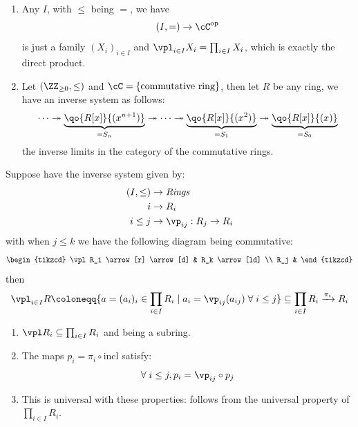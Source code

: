 \begin{eg}
	\leavevmode
	\begin{enumerate}
		\item Any \( I \), with \( \leq \) being \( = \), we have
		      \[
			      (I,=) \to \cC^\text{op}
		      \]
		      is just a family \( (X_i)_{i\in I} \) and \( \vpl_{i\in I}X_i = \prod_{i\in I} X_i \), which
		      is exactly the direct product.
		\item Let \( (\ZZ_{\geq 0}, \leq) \) and \( \cC = \{\text{commutative ring}\} \), then let \( R \) be any
		      ring, we have an inverse system as follows:
		      \[
			      \cdots \twoheadrightarrow \underbrace{\qo{R[x]}{(x^{n+1})}}_{=S_n} \twoheadrightarrow \cdots
			      \twoheadrightarrow \underbrace{\qo{R[x]}{(x^2)}}_{=S_1} \twoheadrightarrow \underbrace{\qo{R[x]}{(x)}}_{=S_0}
		      \]
		      the inverse limits in the category of the commutative rings.
	\end{enumerate}
\end{eg}

\begin{remark}
	Suppose have the inverse system given by:
	\[
		\begin{aligned}
			(I,\leq) & \to \text{\textit{Rings}} \\
			i        & \to R_i                   \\
			i\leq j  & \to \vp_{ij}: R_j \to R_i
		\end{aligned}
	\]
	with when \( j\leq k \) we have the following diagram being commutative:
	\[
		\begin{tikzcd}
			\vpl R_i \arrow[r] \arrow[d] & R_k \arrow[ld] \\
			R_j &
		\end{tikzcd}
	\]
	then
	\[
		\vpl_{i\in I} R \coloneqq  \{a = (a_i)_i \in \prod_{i\in I} R_i \; | \; a_i = \vp_{ij}(a_{ij})
		\; \forall \; i \leq j \} \subseteq \prod_{i\in I} R_i \xrightarrow{\pi_i} R_i
	\]
\end{remark}

\begin{exercise}
	\leavevmode
	\begin{enumerate}
		\item \( \vpl R_i \subseteq \prod_{i\in I} R_i \) and being a subring.
		\item The maps \( p_i = \pi_i \circ \text{incl} \) satisfy:
		      \[
			      \forall \; i \leq j, p_i = \vp_{ij} \circ p_j
		      \]
		\item This is universal with these properties: follows from the universal property of \(
		      \prod_{i\in I} R_i \).
	\end{enumerate}
\end{exercise}

